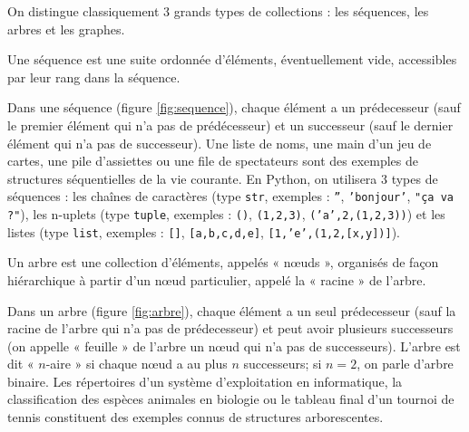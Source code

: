 On distingue classiquement 3 grands types de collections : les séquences, les arbres et les graphes.

\begin{defin}[séquence]
Une séquence est une suite ordonnée d'éléments, éventuellement vide, accessibles par leur rang dans la séquence.
\end{defin}

Dans une séquence (figure \ref{fig:sequence}), chaque élément a un prédecesseur (sauf le premier élément qui n'a pas de
prédécesseur) et un successeur (sauf le dernier élément qui n'a pas de successeur).
Une liste de noms, une main d'un jeu de cartes, une pile d'assiettes ou une file de spectateurs
sont des exemples de structures séquentielles de la vie courante.
En {\sc Python}, on utilisera 3 types de séquences : 
les chaînes de caractères (type {\tt str}, exemples : {\tt ''}, {\tt 'bonjour'}, {\tt "ça va ?"}), 
les n-uplets (type {\tt tuple}, exemples : {\tt ()}, {\tt (1,2,3)}, {\tt ('a',2,(1,2,3))})
et les listes (type {\tt list}, exemples : {\tt []}, {\tt [a,b,c,d,e]}, {\tt [1,'e',(1,2,[x,y])]}).


\begin{defin}[arbre]
Un arbre est une collection d'éléments, appelés « n\oe uds », organisés de façon hiérarchique à partir 
d'un n\oe ud particulier, appelé la « racine » de l'arbre.
\end{defin}

Dans un arbre (figure \ref{fig:arbre}), chaque élément a un seul prédecesseur (sauf la racine de l'arbre 
qui n'a pas de prédecesseur) et peut avoir plusieurs successeurs (on appelle « feuille » de l'arbre un n\oe ud qui 
n'a pas de successeurs). L'arbre est dit « $n$-aire » si chaque n\oe ud a au plus $n$ successeurs;
si $n=2$, on parle d'arbre binaire.
Les répertoires d'un système d'exploitation en informatique,
la classification des espèces animales en biologie ou
le tableau final d'un tournoi de tennis
constituent des exemples connus de structures arborescentes.

